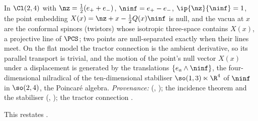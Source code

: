 In $\Cl(2,4)$ with $\nz = \tfrac12(e_{+} + e_{-})$, $\ninf = e_{+} - e_{-}$, $\ip{\nz}{\ninf} = 1$, the point embedding $X(x) = \nz + x - \tfrac12 Q(x)\ninf$ is null, and the vacua at $x$ are the conformal spinors (twistors) whose isotropic three-space contains $X(x)$, a projective line of $\PCS$; two points are null-separated exactly when their lines meet. On the flat model the tractor connection is the ambient derivative, so its parallel transport is trivial, and the motion of the point's null vector $X(x)$ under a displacement is generated by the translations $\{e_a \wedge \ninf\}$, the four-dimensional nilradical of the ten-dimensional stabiliser $\so(1,3) \ltimes \R^{4}$ of $\ninf$ in $\so(2,4)$, the Poincar\'e algebra. \emph{Provenance:} \cite[Fact~2.3, Prop.~4.1(2)]{ButlerT16} (, ); the incidence theorem and the stabiliser \cite[Thm.~4.2, Fact~4.3]{ButlerT9} (, ); the tractor connection \cite{BEG1994}.

This restates .
